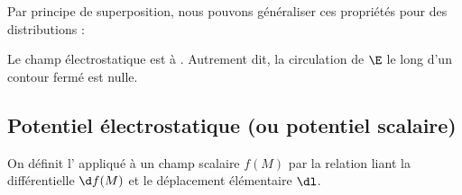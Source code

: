 \documentclass[12pt,fancy]{/Users/victor/Documents/COURS/2ACapECL/texmf/tex/latex/Preambles/cours}
\begin{document}
\begin{remarque}
Par principe de superposition, nous pouvons généraliser ces propriétés pour des distributions : 
\end{remarque}

\begin{prop}
Le champ électrostatique est à . Autrement dit, la circulation de $\E$ le long d'un contour fermé est nulle.
\end{prop}

\subsection{Potentiel électrostatique (ou potentiel scalaire)}


\begin{definition}
On définit l' appliqué à un champ scalaire $f(M)$ par la relation liant la différentielle $\d f(M)$ et le déplacement élémentaire $\dl$.
\end{definition}
\end{document}
